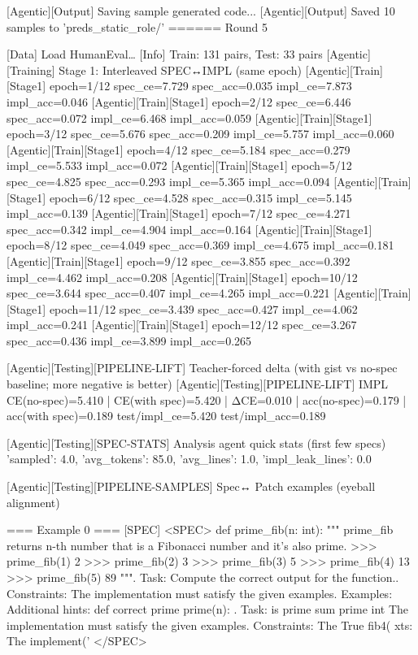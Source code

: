 [Agentic][Output] Saving sample generated code...
[Agentic][Output] Saved 10 samples to 'preds_static_role/'
======
Round 5

[Data] Load HumanEval…
[Info] Train: 131 pairs, Test: 33 pairs
[Agentic][Training] Stage 1: Interleaved SPEC↔IMPL (same epoch)
[Agentic][Train][Stage1] epoch=1/12 spec_ce=7.729 spec_acc=0.035 impl_ce=7.873 impl_acc=0.046
[Agentic][Train][Stage1] epoch=2/12 spec_ce=6.446 spec_acc=0.072 impl_ce=6.468 impl_acc=0.059
[Agentic][Train][Stage1] epoch=3/12 spec_ce=5.676 spec_acc=0.209 impl_ce=5.757 impl_acc=0.060
[Agentic][Train][Stage1] epoch=4/12 spec_ce=5.184 spec_acc=0.279 impl_ce=5.533 impl_acc=0.072
[Agentic][Train][Stage1] epoch=5/12 spec_ce=4.825 spec_acc=0.293 impl_ce=5.365 impl_acc=0.094
[Agentic][Train][Stage1] epoch=6/12 spec_ce=4.528 spec_acc=0.315 impl_ce=5.145 impl_acc=0.139
[Agentic][Train][Stage1] epoch=7/12 spec_ce=4.271 spec_acc=0.342 impl_ce=4.904 impl_acc=0.164
[Agentic][Train][Stage1] epoch=8/12 spec_ce=4.049 spec_acc=0.369 impl_ce=4.675 impl_acc=0.181
[Agentic][Train][Stage1] epoch=9/12 spec_ce=3.855 spec_acc=0.392 impl_ce=4.462 impl_acc=0.208
[Agentic][Train][Stage1] epoch=10/12 spec_ce=3.644 spec_acc=0.407 impl_ce=4.265 impl_acc=0.221
[Agentic][Train][Stage1] epoch=11/12 spec_ce=3.439 spec_acc=0.427 impl_ce=4.062 impl_acc=0.241
[Agentic][Train][Stage1] epoch=12/12 spec_ce=3.267 spec_acc=0.436 impl_ce=3.899 impl_acc=0.265

[Agentic][Testing][PIPELINE-LIFT] Teacher-forced delta (with gist vs no-spec baseline; more negative is better)
[Agentic][Testing][PIPELINE-LIFT] IMPL CE(no-spec)=5.410 | CE(with spec)=5.420 | ΔCE=0.010 | acc(no-spec)=0.179 | acc(with spec)=0.189
test/impl_ce=5.420 test/impl_acc=0.189

[Agentic][Testing][SPEC-STATS] Analysis agent quick stats (first few specs)
{'sampled': 4.0, 'avg_tokens': 85.0, 'avg_lines': 1.0, 'impl_leak_lines': 0.0}

[Agentic][Testing][PIPELINE-SAMPLES] Spec↔ Patch examples (eyeball alignment)

=== Example 0 ===
[SPEC]
<SPEC> def prime_fib(n: int): """ prime_fib returns n-th number that is a Fibonacci number and it's also prime. >>> prime_fib(1) 2 >>> prime_fib(2) 3 >>> prime_fib(3) 5 >>> prime_fib(4) 13 >>> prime_fib(5) 89 """. Task: Compute the correct output for the function.. Constraints: The implementation must satisfy the given examples. Examples: Additional hints: def correct prime prime(n): . Task: is prime sum prime int The implementation must satisfy the given examples. Constraints: The True fib4( xts: The implement(' </SPEC>


